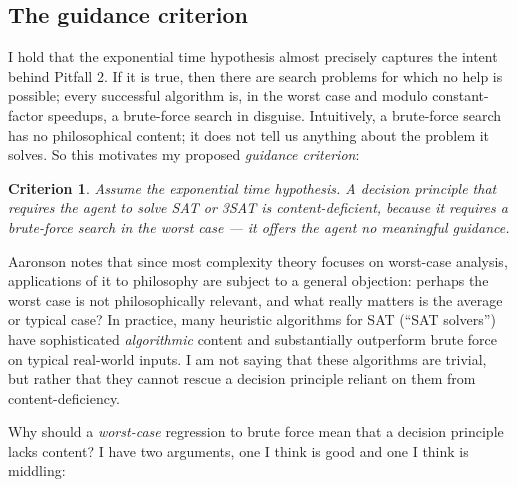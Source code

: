\documentclass[letterpaper,12pt]{article}
\newtheorem{criterion}{Criterion}
\begin{document}
\subsection{The guidance criterion}
I hold that the exponential time hypothesis almost precisely captures the intent behind Pitfall 2. If it is true, then there are search problems for which no help is possible; every successful algorithm is, in the worst case and modulo constant-factor speedups, a brute-force search in disguise. Intuitively, a brute-force search has no philosophical content; it does not tell us anything about the problem it solves. So this motivates my proposed \emph{guidance criterion}:

\begin{criterion}
\label{guidance}
Assume the exponential time hypothesis. A decision principle that requires the agent to solve SAT or 3SAT is \emph{content-deficient}, because it requires a brute-force search in the worst case --- it offers the agent no meaningful \emph{guidance}.
\end{criterion}

Aaronson notes that since most complexity theory focuses on worst-case analysis, applications of it to philosophy are subject to a general objection: perhaps the worst case is not philosophically relevant, and what really matters is the average or typical case? In practice, many heuristic algorithms for SAT (``SAT solvers'') have sophisticated \emph{algorithmic} content and substantially outperform brute force on typical real-world inputs. I am not saying that these algorithms are trivial, but rather that they cannot rescue a decision principle reliant on them from content-deficiency.

Why should a \emph{worst-case} regression to brute force mean that a decision principle lacks content? I have two arguments, one I think is good and one I think is middling:
\end{document}
